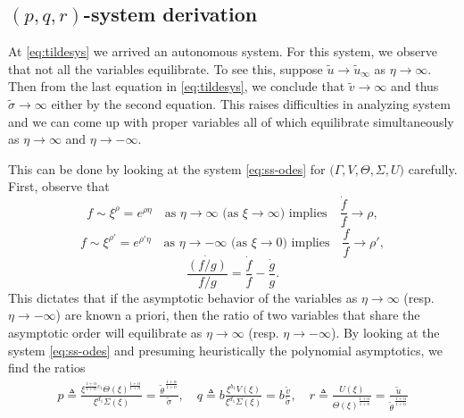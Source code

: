 \documentclass[a4paper,11pt]{article}
\def\tv{{\tilde{v}}}
\def\tth{{\tilde{\theta}}}
\def\ts{{\tilde{\sigma}}}
\def\tu{{\tilde{u}}}
\begin{document}
\subsection{$(p,q,r)$-system derivation}
At \eqref{eq:tildesys} we arrived  an autonomous system. For this system, we observe that not all the variables equilibrate. To see this, suppose $\tu \rightarrow \tu_\infty$ as $\eta \rightarrow \infty$. Then from the last equation in \eqref{eq:tildesys}, we conclude that $\tv \rightarrow \infty$ and thus $\ts \rightarrow \infty$ either by the second equation. This raises difficulties in analyzing system and we can come up with proper variables all of which equilibrate simultaneously as $\eta \rightarrow \infty$ and $\eta \rightarrow -\infty$.

This can be done by looking at the system \eqref{eq:ss-odes} for $\big(\Gamma,V,\Theta,\Sigma,U)$ carefully. First, observe that
$$ f \sim \xi^\rho=e^{\rho\eta} \quad \text{as $\eta \rightarrow \infty$ (as $\xi \rightarrow \infty$) implies} \quad \frac{\dot{f}}{f} \rightarrow \rho,$$
$$ f \sim \xi^{\rho'}=e^{\rho'\eta} \quad \text{as $\eta \rightarrow -\infty$ (as $\xi \rightarrow 0$) implies} \quad \frac{\dot{f}}{f} \rightarrow \rho',$$
$$ \frac{\dot{(f/g)}}{f/g} = \frac{\dot{f}}{f} - \frac{\dot{g}}{g}. $$
This dictates that if the asymptotic behavior of the variables as $\eta \rightarrow \infty$ (resp. $\eta \rightarrow -\infty$) are known a priori, then the ratio of two variables that share the asymptotic order will equilibrate as $\eta \rightarrow \infty$ (resp. $\eta \rightarrow -\infty$). By looking at the system \eqref{eq:ss-odes} and presuming heuristically the polynomial asymptotics, we find the ratios
\begin{equation}\label{eq:pqrdef}
 \begin{aligned}
  p \triangleq \frac{ \xi^{\frac{1+\alpha}{1+n}c_1} \Theta(\xi)^{\frac{1+\alpha}{1+n}}}{\xi^{d_1} \Sigma(\xi)}=\frac{\tth^{\,\frac{1+\alpha}{1+n}}}{\ts}, \quad q \triangleq b\frac{ \xi^{b_1} V(\xi) }{ \xi^{d_1} \Sigma(\xi)}=b \frac{\tv}{\ts},  \quad r \triangleq \frac{ U(\xi) }{ \Theta(\xi)^{\frac{1+\alpha}{1+n}} } = \frac{\tu}{\tth^{\,\frac{1+\alpha}{1+n}}}
 \end{aligned}
\end{equation}
\end{document}

